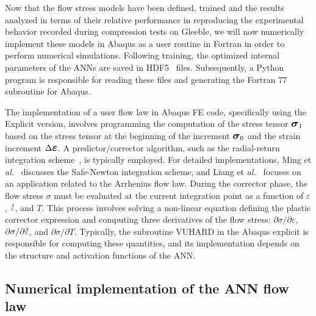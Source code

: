 \documentclass[algorithms,article,submit,pdftex,oneauthors]{Definitions/mdpi}
\makeatletter
\DeclareRobustCommand{\mdot}[1]{\accentset{\mbox{\bfseries .}}{#1}}
\DeclareRobustCommand{\eal}{et \emph{al.}\@\xspace}
\DeclareRobustCommand{\Sig}{\mbox{\large\ensuremath{\boldsymbol{\sigma}}}}
\DeclareRobustCommand{\Eps}{\mbox{\large\ensuremath{\boldsymbol{\varepsilon}}}}
\makeatother
\begin{document}
Now that the flow stress models have been defined, trained and the results analyzed in terms of their relative performance in reproducing the experimental behavior recorded during compression tests on Gleeble, we will now numerically implement these models in Abaqus as a user routine in Fortran in order to perform numerical simulations.
\textcolor{greencolor}{Following training, the optimized internal parameters of the ANNs are saved in HDF5~\cite{Koranne-2011-HDF} files. Subsequently, a Python program is responsible for reading these files and generating the Fortran 77 subroutine for Abaqus.}

\textcolor{greencolor}{The implementation of a user flow law in Abaqus FE code, specifically using the Explicit version, involves programming the computation of the stress tensor $\Sig_{1}$ based on the stress tensor at the beginning of the increment $\Sig_{0}$ and the strain increment $\Delta\Eps$. 
A predictor/corrector algorithm, such as the radial-return integration scheme~\cite{Ponthot-2002-USU}, is typically employed. 
For detailed implementations, Ming \eal~\cite{Ming-2018-ERV} discusses the Safe-Newton integration scheme, and Liang \eal~\cite{Liang-2022} focuses on an application related to the Arrhenius flow law. 
During the corrector phase, the flow stress $\sigma$ must be evaluated at the current integration point as a function of $\varepsilon$, $\mdot{\varepsilon}$, and $T$. 
This process involves solving a non-linear equation defining the plastic corrector expression and computing three derivatives of the flow stress: $\partial\sigma/\partial\varepsilon$, $\partial\sigma/\partial\mdot{\varepsilon}$, and $\partial\sigma/\partial T$. 
Typically, the subroutine VUHARD in the Abaqus explicit is responsible for computing these quantities, and its implementation depends on the structure and activation functions of the ANN.}

\subsection{Numerical implementation of the ANN flow law}\label{subsec:Num-impl}
\end{document}

